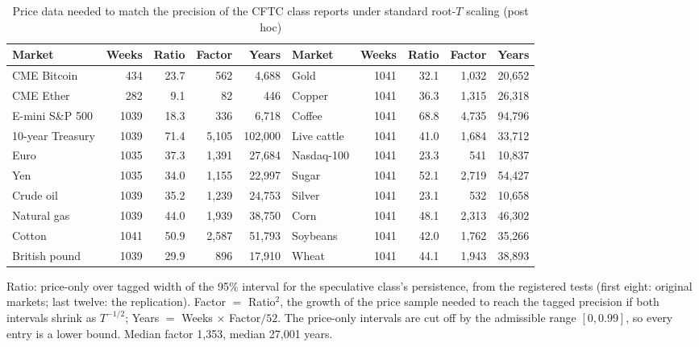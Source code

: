 \documentclass[12pt]{article}
\theoremstyle{definition}
\theoremstyle{remark}
\begin{document}
\begin{table}[!htbp]\centering\footnotesize
\begin{threeparttable}
\caption{Price data needed to match the precision of the CFTC class reports under standard root-$T$ scaling (post hoc)}\label{tab:dataequiv}
\setlength{\tabcolsep}{2.5pt}
\begin{tabular}{lrrrr@{\hspace{10pt}}lrrrr}
\toprule
Market & Weeks & Ratio & Factor & Years & Market & Weeks & Ratio & Factor & Years\\
\midrule
CME Bitcoin & 434 & 23.7 & 562 & 4{,}688 & Gold & 1041 & 32.1 & 1{,}032 & 20{,}652\\
CME Ether & 282 & 9.1 & 82 & 446 & Copper & 1041 & 36.3 & 1{,}315 & 26{,}318\\
E-mini S\&P 500 & 1039 & 18.3 & 336 & 6{,}718 & Coffee & 1041 & 68.8 & 4{,}735 & 94{,}796\\
10-year Treasury & 1039 & 71.4 & 5{,}105 & 102{,}000 & Live cattle & 1041 & 41.0 & 1{,}684 & 33{,}712\\
Euro & 1035 & 37.3 & 1{,}391 & 27{,}684 & Nasdaq-100 & 1041 & 23.3 & 541 & 10{,}837\\
Yen & 1035 & 34.0 & 1{,}155 & 22{,}997 & Sugar & 1041 & 52.1 & 2{,}719 & 54{,}427\\
Crude oil & 1039 & 35.2 & 1{,}239 & 24{,}753 & Silver & 1041 & 23.1 & 532 & 10{,}658\\
Natural gas & 1039 & 44.0 & 1{,}939 & 38{,}750 & Corn & 1041 & 48.1 & 2{,}313 & 46{,}302\\
Cotton & 1041 & 50.9 & 2{,}587 & 51{,}793 & Soybeans & 1041 & 42.0 & 1{,}762 & 35{,}266\\
British pound & 1039 & 29.9 & 896 & 17{,}910 & Wheat & 1041 & 44.1 & 1{,}943 & 38{,}893\\
\bottomrule
\end{tabular}
\begin{tablenotes}\footnotesize\item Ratio: price-only over tagged width of the 95\% interval for the speculative class's persistence, from the registered tests (first eight: original markets; last twelve: the replication). Factor $=$ Ratio$^2$, the growth of the price sample needed to reach the tagged precision if both intervals shrink as $T^{-1/2}$; Years $=$ Weeks $\times$ Factor$/52$. The price-only intervals are cut off by the admissible range $[0,0.99]$, so every entry is a lower bound. Median factor 1{,}353, median 27{,}001 years.\end{tablenotes}
\end{threeparttable}
\end{table}
\end{document}
